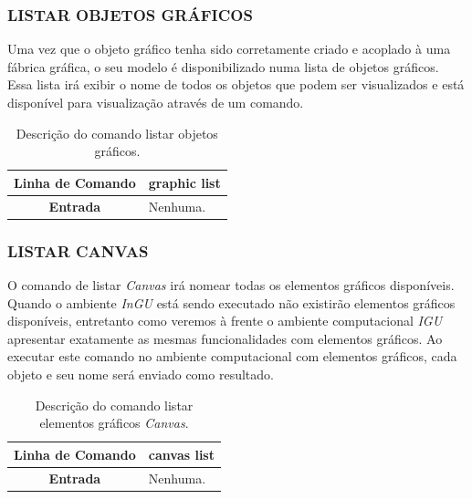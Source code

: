 \documentclass[a4paper,12pt]{monografia}
\theoremstyle{plain}
\theoremstyle{definition}
\theoremstyle{remark}
\begin{document}
\subsubsection{LISTAR OBJETOS GRÁFICOS}\label{sec:graphic_list}

Uma vez que o objeto gráfico tenha sido corretamente criado e acoplado à uma fábrica gráfica, o seu modelo é disponibilizado numa lista de objetos gráficos. Essa lista irá exibir o nome de todos os objetos que podem ser visualizados e está disponível para visualização através de um comando.

\begin{center}
	\begin{table}[!htbp]
		\begin{tabular}{|c|m{}|}
			\hline
			\textbf{Linha de Comando} & graphic list \\
			\hline
			\textbf{Entrada} & Nenhuma. \\
			\hline
		\end{tabular}
		\caption{Descrição do comando listar objetos gráficos.}
		\label{tab:graphic_list}
	\end{table}
\end{center}

\subsubsection{LISTAR CANVAS}\label{sec:canvas_list}

O comando de listar \textit{Canvas} irá nomear todas os elementos gráficos disponíveis. Quando o ambiente \textit{InGU} está sendo executado não existirão elementos gráficos disponíveis, entretanto como veremos à frente o ambiente computacional \textit{IGU} apresentar exatamente as mesmas funcionalidades com elementos gráficos. Ao executar este comando no ambiente computacional com elementos gráficos, cada objeto e seu nome será enviado como resultado.

\begin{center}
	\begin{table}[!htbp]
		\begin{tabular}{|c|m{}|}
			\hline
			\textbf{Linha de Comando} & canvas list \\
			\hline
			\textbf{Entrada} & Nenhuma. \\
			\hline
		\end{tabular}
		\caption{Descrição do comando listar elementos gráficos \textit{Canvas}.}
		\label{tab:canvas_list}
	\end{table}
\end{center}
\end{document}
